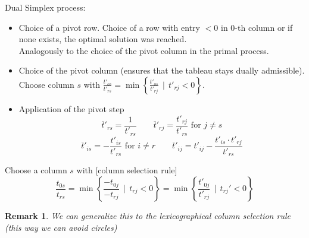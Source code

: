 \documentclass[a4paper]{article}
\numberwithin{lecref}{subsection}
\newtheorem*{Remark}{Remark}
\newcommand{\SetDef}[2]{\left\{#1\,\mid\,#2\right\}}
\begin{document}
Dual Simplex process:
\begin{itemize}
	\item Choice of a pivot row. Choice of a row with entry $< 0$ in 0-th column or if none exists, the optimal solution was reached. \\
		  Analogously to the choice of the pivot column in the primal process.
	\item Choice of the pivot column (ensures that the tableau stays dually admissible). \\
		  Choose column $s$ with $\frac{t'_{os}}{t'_{rs}} = \min\SetDef{\frac{t'_{os}}{t'_{rj}}}{t'_{rj} < 0}$.
	\item Application of the pivot step
		  \[ \overline{t}'_{rs} = \frac{1}{t'_{rs}} \qquad \overline{t}'_{rj} = \frac{t'_{rj}}{t'_{rs}} \text{ for } j \neq s \]
		  \[ \overline{t}'_{is} = -\frac{t'_{is}}{t'_{rs}} \text{ for } i \neq r \qquad \overline{t}'_{ij} = t'_{ij} - \frac{t'_{is} \cdot t'_{rj}}{t'_{rs}} \]
\end{itemize}

Choose a column $s$ with [column selection rule]
\[ \frac{t_{0s}}{t_{rs}} = \min\SetDef{\frac{-t_{0j}}{-t_{rj}}}{t_{rj} < 0} = \min\SetDef{\frac{t'_{0j}}{t'_{rj}}}{t_{rj}' < 0} \]

\begin{Remark}
	We can generalize this to the lexicographical column selection rule (this way we can avoid circles)
\end{Remark}
\end{document}
